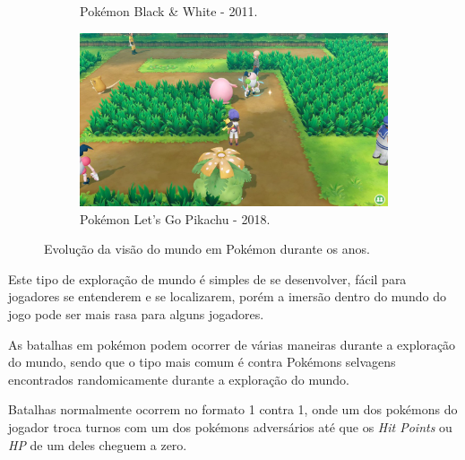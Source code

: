 \documentclass[
	12pt,				%
	openright,			%
	twoside,			%
	a4paper,			%
	english,			%
	french,				%
	spanish,			%
	brazil				%
	]{abntex2}
\begin{document}
\begin{figure}[h!]
\begin{subfigure}[b]{0.4\linewidth}
    \caption{Pokémon Black \& White - 2011.}
  \end{subfigure}
  \begin{subfigure}[b]{0.4\linewidth}
    \includegraphics[width=\linewidth]{lgpikachu.jpg}
    \caption{Pokémon Let’s Go Pikachu - 2018.}
  \end{subfigure}
  \caption{Evolução da visão do mundo em Pokémon durante os anos.}
  \label{fig:pokemon}
\end{figure}

Este tipo de exploração de mundo é simples de se desenvolver, fácil para jogadores se entenderem e se localizarem, porém a imersão dentro do mundo do jogo pode ser mais rasa para alguns jogadores.

	As batalhas em pokémon podem ocorrer de várias maneiras durante a exploração do mundo, sendo que o tipo mais comum é contra Pokémons selvagens encontrados randomicamente durante a exploração do mundo.

	Batalhas normalmente ocorrem no formato 1 contra 1, onde um dos pokémons do jogador troca turnos com um dos pokémons adversários até que os \emph{Hit Points} ou \emph{HP} de um deles cheguem a zero.
\end{document}
